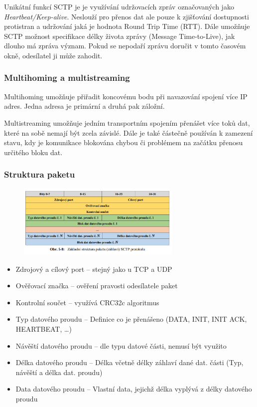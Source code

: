 Unikátní funkcí SCTP je je využívání udržovacích zpráv označovaných jako \textit{Heartbeat/Keep-alive}.
Neslouží pro přenos dat ale pouze k zjišťování dostupnosti protistran a udržování jaká je hodnota Round Trip Time (RTT).
Dále umožňuje SCTP možnost specifikace délky života zprávy (Message Time-to-Live), jak dlouho má zpráva význam.
Pokud se nepodaří zprávu doručit v tomto časovém okně, odesílatel ji může zahodit.

\subsubsection{Multihoming a multistreaming}
Multihoming umožňuje přiřadit koncovému bodu při navazování spojení více IP adres.
Jedna adresa je primární a druhá pak záložní.

Multistreaming umožňuje jedním transportním spojením přenášet více toků dat, které na sobě nemají být zcela závislé.
Dále je také částečně používán k zamezení stavu, kdy je komunikace blokována chybou či problémem na začátku přenosu určitého bloku dat.

\subsubsection{Struktura paketu}

\begin{figure}[!h]
    \centering
    \includegraphics[width=0.7\textwidth]{obrazky/033.png}
\end{figure}

\begin{itemize}[noitemsep]
    \item Zdrojový a cílový port -- stejný jako u TCP a UDP
    \item Ověřovací značka -- ověření pravosti odesílatele paket
    \item Kontrolní součet -- využívá CRC32c algoritmus
    \item Typ datového proudu -- Definice co je přenášeno (DATA, INIT, INIT ACK, HEARTBEAT, \dots)
    \item Návěští datového proudu -- dle typu datové části, nemusí být využito
    \item Délka datového proudu -- Délka včetně délky záhlaví dané dat. části (Typ, návěští a délka dat. proudu)
    \item Data datového proudu -- Vlastní data, jejichž délka vyplývá z délky datového proudu
\end{itemize}

